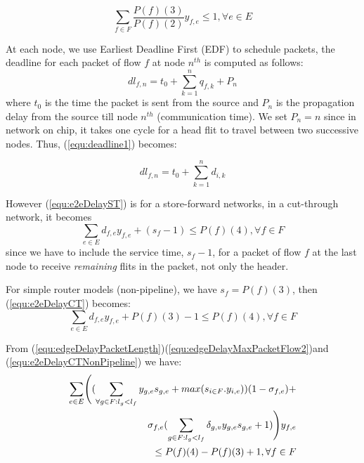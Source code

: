 \documentclass[conference, twocolumn]{IEEEtran}
\theoremstyle{definition}
\begin{document}
\begin{equation}\label{equ:utilization2}
\sum_{f \in F}\frac{P(f)(3)}{P(f)(2)}y_{f,e} \leq 1, \forall e \in E
\end{equation}

At each node, we use Earliest Deadline First (EDF) \cite{VermaJitter91} 
to schedule packets, the deadline for each packet of flow $f$ at node $n^{th}$
is computed as follows: 
\begin{equation}\label{equ:deadline1}
dl_{f,n}=t_0 + \sum_{k=1}^{n}q_{f,k}+P_n
\end{equation}
where $t_0$ is the time the packet is sent from the source and $P_n$ is the propagation
delay from the source till node $n^{th}$ (communication time). We set
$P_n=n$ since in network on chip, it takes one cycle for a head flit to travel
between two successive nodes. Thus, (\ref{equ:deadline1}) becomes:

\begin{equation}\label{equ:deadline2}
dl_{f,n}=t_0 + \sum_{k=1}^{n}d_{i,k}
\end{equation}

However (\ref{equ:e2eDelayST}) is for a store-forward networks, in a
cut-through network, it becomes
\begin{equation}\label{equ:e2eDelayCT}
\sum_{e \in E}d_{f,e}y_{f,e} + (s_f - 1) \leq P(f)(4), \forall f \in F
\end{equation}
since we have to include the service time, $s_f-1$, for a packet of flow $f$ at
the last node to receive {\em remaining} flits in the packet, not only the
header.

For simple router models (non-pipeline), we have $s_f = P(f)(3)$, then
(\ref{equ:e2eDelayCT}) becomes:
\begin{equation}\label{equ:e2eDelayCTNonPipeline}
\sum_{e \in E}d_{f,e}y_{f,e} + P(f)(3) - 1 \leq P(f)(4), \forall f \in F
\end{equation}

From (\ref{equ:edgeDelayPacketLength})(\ref{equ:edgeDelayMaxPacketFlow2})and
(\ref{equ:e2eDelayCTNonPipeline}) we have:
\begin{eqnarray}\label{equ:e2eDelayCTNonPipeline1}
\sum_{e \in E} \Biggl((\sum_{\forall g \in F:l_g <
l_{f}}y_{g,e}s_{g,e}+max(s_{i \in F}.y_{i,e}))(1-\sigma_{f,e}) +
\notag \\ 
\sigma_{f,e}(\sum_{g \in F:l_g <
l_f}\delta_{g,v}y_{g,e}s_{g,e} + 1)\Biggr) y_{f,e} \notag \\ \leq
P(f)(4)-P(f)(3) + 1, \forall f \in F
\end{eqnarray}
\end{document}
